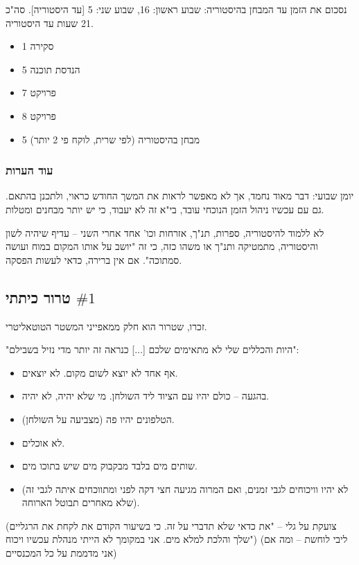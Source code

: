 \documentclass[a4paper]{book}
\begin{document}
	נסכום את הזמן עד המבחן בהיסטוריה: 
	שבוע ראשון: 16, שבוע שני: 5 [עד היסטוריה]. סה"כ 21 שעות עד היסטוריה. 
	\begin{multicols}{2}
		\begin{itemize}
			\item 1 סקירה
			\item 5 הנדסת תוכנה
			\item 7 פרויקט
			\item 8 פרויקט
			\item 5 מבחן בהיסטוריה (לפי שרית, לוקח פי 2 יותר)
		\end{itemize}
	\end{multicols}
	
	\subsubsection{עוד הערות}
	יומן שבועי: דבר מאוד נחמד, אך לא מאפשר לראות את המשך החודש כראוי, ולתכנן בהתאם. גם עם עכשיו ניהול הזמן הנוכחי עובד, בי"א זה לא יעבוד, כי יש יותר מבחנים ומטלות. 
	
	לא ללמוד להיסטוריה, ספרות, תנ"ך, אזרחות וכו' אחד אחרי השני – עדיף שיהיה לשון והיסטוריה, מתמטיקה ותנ"ך או משהו כזה, כי זה "יושב על אותו המקום במוח ועושה סמתוכה". אם אין ברירה, כדאי לעשות הפסקה. 
	
	
	
	
	\subsection{טרור כיתתי $\#1$}
	
	זכרו, שטרור הוא חלק ממאפייני המשטר הטוטאליטרי. 
	
	"היות והכללים שלי לא מתאימים שלכם [...] כנראה זה יותר מדי נזיל בשבילם": 
	\begin{itemize}
		\item אף אחד לא יוצא לשום מקום. לא יוצאים. 
		\item בהגעה – כולם יהיו עם הציוד ליד השולחן. מי שלא יהיה, לא יהיה. 
		\item הטלפונים יהיו פה (מצביעה על השולחן). 
		\item לא אוכלים. 
		\item שותים מים בלבד מבקבוק מים שיש בתוכו מים. 
		\item (לא יהיו וויכוחים לגבי זמנים, ואם המרוה מגיעה חצי דקה לפני ומתווכחים איתה לגבי זה שלא מאחרים תבוטל הארוחה).
	\end{itemize}
	
	(צועקת על גלי – "את כדאי שלא תדברי על זה. כי בשיעור הקודם את לקחת את הרגליים שלך והלכת למלא מים. אני במקומך לא הייתי מנהלת עכשיו ויכוח") (ליבי לוחשת – ומה אם אני מדממת על כל המכנסיים)
	
\end{document}
